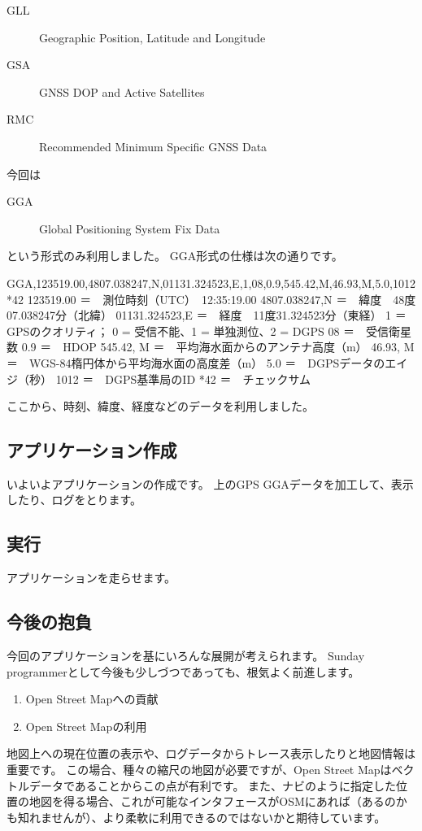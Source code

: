\documentclass[mingoth,a4paper]{jsarticle}
\begin{document}
\begin{description}
 \item[GLL] Geographic Position, Latitude and Longitude
 \item[GSA] GNSS DOP and Active Satellites
 \item[RMC] Recommended Minimum Specific GNSS Data
\end{description}

今回は

\begin{description}
 \item[GGA] Global Positioning System Fix Data
\end{description}

という形式のみ利用しました。
\clearpage
GGA形式の仕様は次の通りです。

\begin{commandline}
GGA,123519.00,4807.038247,N,01131.324523,E,1,08,0.9,545.42,M,46.93,M,5.0,1012*42
123519.00 	＝　測位時刻（UTC）　12:35:19.00
4807.038247,N 	＝　緯度　48度07.038247分（北緯）
01131.324523,E 	＝　経度　11度31.324523分（東経）
1 	＝　GPSのクオリティ； 0 = 受信不能、1 = 単独測位、2 = DGPS
08 	＝　受信衛星数
0.9 	＝　HDOP
545.42, M 	＝　平均海水面からのアンテナ高度（m）
46.93, M 	＝　WGS-84楕円体から平均海水面の高度差（m）
5.0 	＝　DGPSデータのエイジ（秒）
1012 	＝　DGPS基準局のID
*42 	＝　チェックサム
\end{commandline}

ここから、時刻、緯度、経度などのデータを利用しました。

\subsection{アプリケーション作成}
いよいよアプリケーションの作成です。
上のGPS GGAデータを加工して、表示したり、ログをとります。


\subsection{実行}
アプリケーションを走らせます。

\subsection{今後の抱負}
今回のアプリケーションを基にいろんな展開が考えられます。
Sunday programmerとして今後も少しづつであっても、根気よく前進します。
\begin{enumerate}
      \item Open Street Mapへの貢献 
      \item Open Street Mapの利用
\end{enumerate}
地図上への現在位置の表示や、ログデータからトレース表示したりと地図情報は重要です。
この場合、種々の縮尺の地図が必要ですが、Open Street Mapはベクトルデータであることからこの点が有利です。
また、ナビのように指定した位置の地図を得る場合、これが可能なインタフェースがOSMにあれば（あるのかも知れませんが）、より柔軟に利用できるのではないかと期待しています。
\end{document}
